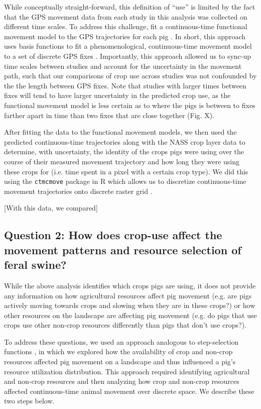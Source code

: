 \documentclass[a4paper]{article}
\begin{document}
While conceptually straight-forward, this definition of ``use'' is limited by the fact that the GPS movement data from each study in this analysis was collected on different time scales. To address this challenge, fit a continuous-time functional movement model to the GPS trajectories for each pig \citep{Buderman2016}.  In short, this approach uses basis functions to fit a phenomenological, continuous-time movement model to a set of discrete GPS fixes \citep[see SI for a full description][]{Buderman2016}.  Importantly, this approach allowed us to sync-up time scales between studies and account for the uncertainty in the movement path, such that our comparisons of crop use across studies was not confounded by the the length between GPS fixes. Note that studies with larger times between fixes will tend to have larger uncertainty in the predicted crop use, as the functional movement model is less certain as to where the pigs is between to fixes farther apart in time than two fixes that are close together (Fig. X).

After fitting the data to the functional movement models, we then used the predicted continuous-time trajectories along with the NASS crop layer data to determine, with uncertainty, the identity of the crops pigs were using over the course of their measured movement trajectory and how long they were using these crops for (i.e. time spent in a pixel with a certain crop type). We did this using the \texttt{ctmcmove} package in R which allows us to discretize continuous-time movement trajectories onto discrete raster grid \citep{Hanks2015}. 

[With this data, we compared]

\subsection*{Question 2: How does crop-use affect the movement patterns and resource selection of feral swine?}

While the above analysis identifies which crops pigs are using, it does not provide any information on how agricultural resources affect pig movement (e.g. are pigs actively moving towards crops and slowing when they are in these crops?) or how other resources on the landscape are affecting pig movement (e.g. do pigs that use crops use other non-crop resources differently than pigs that don't use crops?).  

To address these questions, we used an approach analogous to step-selection functions \citep{Thurfjell2014}, in which we explored how the availability of crop and non-crop resources affected pig movement on a landscape and thus influenced a pig's resource utilization distribution. This approach required identifying agricultural and non-crop resources and then analyzing how crop and non-crop resources affected continuous-time animal movement over discrete space. We describe these two steps below.
\end{document}

